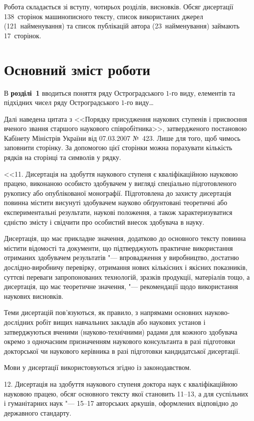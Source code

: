 \documentclass[
]{mon2017dev-aref}[2021/04/12]
\theoremstyle{plain}
\theoremstyle{definition}
\theoremstyle{remark}
\begin{document}
Робота складається зі вступу, чотирьох розділів, висновків. Обсяг
дисертації 138~сторінок машинописного тексту, список використаних
джерел (121~найменування) та список публікацій автора
(23~найменування) займають 17~сторінок.


\part{Основний зміст роботи}

В \textbf{розділі~1} вводиться поняття ряду Остроградського $1$-го
виду, елементів та підхідних чисел ряду Остроградського $1$-го
виду\ldots

Далі наведена цитата з <<Порядку присудження наукових ступенів і
присвоєння вченого звання старшого наукового співробітника>>,
затвердженого постановою Кабінету Міністрів України від 07.03.2007
№~423. Лише для того, щоб чимось заповнити сторінку. За допомогою
цієї сторінки можна порахувати кількість рядків на сторінці та
символів у рядку.

<<11. Дисертація на здобуття наукового ступеня є кваліфікаційною
науковою працею, виконаною особисто здобувачем у вигляді
спеціально підготовленого рукопису або опублікованої монографії.
Підготовлена до захисту дисертація повинна містити висунуті
здобувачем науково обґрунтовані теоретичні або експериментальні
результати, наукові положення, а також характеризуватися єдністю
змісту і свідчити про особистий внесок здобувача в науку.

Дисертація, що має прикладне значення, додатково до основного
тексту повинна містити відомості та документи, що підтверджують
практичне використання отриманих здобувачем результатів "---
впровадження у виробництво, достатню дослідно-виробничу перевірку,
отримання нових кількісних і якісних показників, суттєві переваги
запропонованих технологій, зразків продукції, матеріалів тощо, а
дисертація, що має теоретичне значення, "--- рекомендації щодо
використання наукових висновків.

Теми дисертацій пов'язуються, як правило, з напрямами основних
науково-дослідних робіт вищих навчальних закладів або наукових
установ і затверджуються вченими (науково-технічними) радами для
кожного здобувача окремо з одночасним призначенням наукового
консультанта в разі підготовки докторської чи наукового керівника
в разі підготовки кандидатської дисертації.

Мови у дисертації використовуються згідно із законодавством.

12. Дисертація на здобуття наукового ступеня доктора наук є
кваліфікаційною науковою працею, обсяг основного тексту якої
становить 11--13, а для суспільних і гуманітарних наук "--- 15--17
авторських аркушів, оформлених відповідно до державного стандарту.
\end{document}
